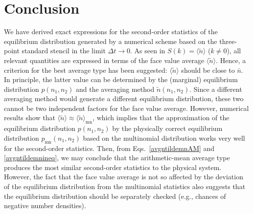 \documentclass{article}
\newcommand{\dt}{{\Delta t}}
\newcommand{\avgntilde}{{\langle\tilde{n}\rangle}}
\newcommand{\nb}{\bar{n}}
\begin{document}
\section{Conclusion}

We have derived exact expressions for the second-order statistics of the equilibrium distribution generated by a numerical scheme based on the three-point standard stencil in the limit $\dt\rightarrow0$.
As seen in $S(k)=\avgntilde$ ($k\ne0$), all relevant quantities are expressed in terms of the face value average $\avgntilde$.
Hence, a criterion for the best average type has been suggested: $\avgntilde$ should be close to $\nb$.
In principle, the latter value can be determined by the (marginal) equilibrium distribution $p(n_1,n_2)$ and the averaging method $\tilde{n}(n_1,n_2)$.
Since a different averaging method would generate a different equilibrium distribution, these two cannot be two independent factors for the face value average.
However, numerical results show that $\avgntilde\approx\avgntilde_\mathrm{mn}$, which implies that the approximation of the equilibrium distribution $p(n_1,n_2)$ by the physically correct equilibrium distribution $p_\mathrm{mn}(n_1,n_2)$ based on the multinomial distribution works very well for the second-order statistics.
Then, from Eqs.~\eqref{avgntildemnAM} and \eqref{avgntildemnineq}, we may conclude that the arithmetic-mean average type produces the most similar second-order statistics to the physical system.
However, the fact that the face value average is not so affected by the deviation of the equilibrium distribution from the multinomial statistics also suggests that the equilibrium distribution should be separately checked (e.g., chances of negative number densities). 
\end{document}
